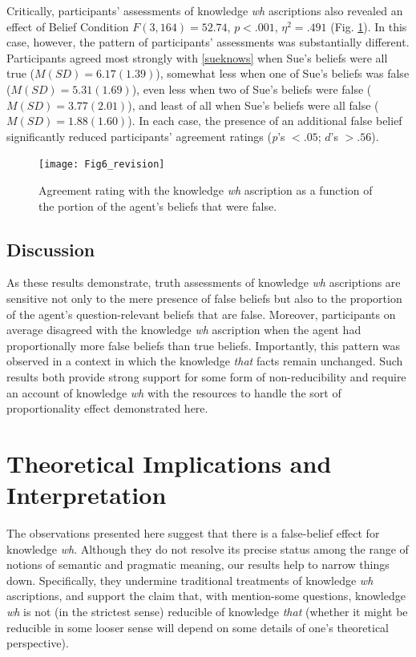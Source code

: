 \documentclass[a4paper]{article}
\begin{document}
Critically, participants' assessments of knowledge \textit{wh} ascriptions also revealed an effect of Belief Condition $F(3,164) = 52.74$, $p < .001$, $\eta^2 = .491$ (Fig. \ref{fig:Fig7}). In this case, however, the pattern of participants' assessments was substantially different. Participants agreed most strongly with \ref{sueknows} when Sue's beliefs were all true (${M}({SD}) = 6.17(1.39)$), somewhat less when one of Sue's beliefs was false (${M}({SD}) = 5.31(1.69)$), even less when two of Sue's beliefs were false (${M}({SD}) = 3.77(2.01)$), and least of all when Sue's beliefs were all false (${M}({SD}) = 1.88(1.60)$). In each case, the presence of an additional false belief significantly reduced participants' agreement ratings (\textit{p}'s $< .05$; $d$'s $> .56$).

\begin{figure}[h!]
\centering
\texttt{[image: Fig6\_revision]}
\captionsetup{width=0.9\textwidth}
\caption{Agreement rating with the knowledge \textit{wh} ascription as a function of the portion of the agent's beliefs that were false.}
\label{fig:Fig7}
\end{figure}

\subsection{Discussion}

As these results demonstrate,  truth assessments of knowledge \textit{wh} ascriptions are sensitive not only to the mere presence of false beliefs but also to the proportion of the agent's question-relevant beliefs that are false. Moreover, participants on average disagreed with the knowledge \textit{wh} ascription when the agent had proportionally more false beliefs than true beliefs. Importantly, this pattern was observed in a context in which the knowledge \textit{that} facts remain unchanged. Such results both provide strong support for some form of non-reducibility and require an account of knowledge \textit{wh} with the resources to handle the sort of proportionality effect demonstrated here. 

\section{Theoretical Implications and Interpretation}

The observations presented here suggest that there is a false-belief effect for knowledge \textit{wh}. Although they do not resolve its precise status among the range of notions of semantic and pragmatic meaning, our results help to narrow things down. Specifically, they undermine traditional treatments of knowledge \textit{wh} ascriptions, and support the claim that, with mention-some questions, knowledge \textit{wh} is not (in the strictest sense) reducible of knowledge \textit{that} (whether it might be reducible in some looser sense will depend on some details of one's theoretical perspective).
\end{document}
